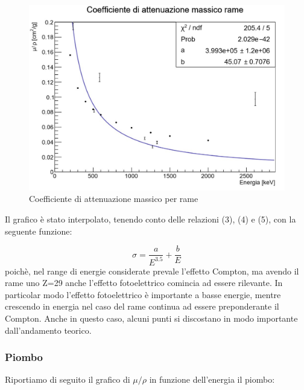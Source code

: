\documentclass[a4paper,10pt]{article}
\begin{document}
\begin{figure}[H]
    \centering
    \includegraphics[scale=0.6]{grafici/massicorame}
    \caption{Coefficiente di attenuazione massico per rame}
\end{figure}

\noindent Il grafico \`e stato interpolato, tenendo conto delle relazioni (3), (4) e (5), con la seguente funzione:

\begin{equation}
	\sigma = \frac{a}{E^{3.5}} + \frac{b}{E}
\end{equation}
\noindent poich\`e, nel range di energie considerate prevale l'effetto Compton, ma avendo il rame uno Z=29 anche l'effetto fotoelettrico comincia ad essere rilevante. In particolar modo l'effetto fotoelettrico \`e importante a basse energie, mentre crescendo in energia nel caso del rame continua ad essere preponderante il Compton. Anche in questo caso, alcuni punti si discostano in modo importante dall'andamento teorico.

\subsubsection{Piombo}
Riportiamo di seguito il grafico di $\mu/\rho$ in funzione dell'energia il piombo:
\end{document}
